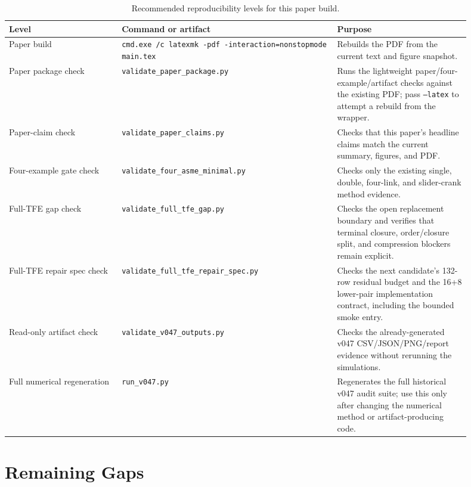 \documentclass[11pt]{article}
\newcommand{\tfe}{TFE}
\newcommand{\artifact}[1]{\texttt{#1}}
\begin{document}
\begin{table}[t]
\centering
\caption{Recommended reproducibility levels for this paper build.}
\label{tab:repro-levels}
\begin{tabular}{P{0.22\linewidth}P{0.42\linewidth}P{0.26\linewidth}}
\toprule
Level & Command or artifact & Purpose \\
\midrule
Paper build &
\artifact{cmd.exe /c latexmk -pdf -interaction=nonstopmode main.tex} &
Rebuilds the PDF from the current text and figure snapshot. \\
Paper package check &
\artifact{validate\_paper\_package.py} &
Runs the lightweight paper/four-example/artifact checks against the existing
PDF; pass \artifact{--latex} to attempt a rebuild from the wrapper. \\
Paper-claim check &
\artifact{validate\_paper\_claims.py} &
Checks that this paper's headline claims match the current summary, figures,
and PDF. \\
Four-example gate check &
\artifact{validate\_four\_asme\_minimal.py} &
Checks only the existing single, double, four-link, and slider-crank method
evidence. \\
Full-\tfe{} gap check &
\artifact{validate\_full\_tfe\_gap.py} &
Checks the open replacement boundary and verifies that terminal closure,
order/closure split, and compression blockers remain explicit. \\
Full-\tfe{} repair spec check &
\artifact{validate\_full\_tfe\_repair\_spec.py} &
Checks the next candidate's 132-row residual budget and the 16+8 lower-pair
implementation contract, including the bounded smoke entry. \\
Read-only artifact check &
\artifact{validate\_v047\_outputs.py} &
Checks the already-generated v047 CSV/JSON/PNG/report evidence without
rerunning the simulations. \\
Full numerical regeneration &
\artifact{run\_v047.py} &
Regenerates the full historical v047 audit suite; use this only after changing
the numerical method or artifact-producing code. \\
\bottomrule
\end{tabular}
\end{table}

\section{Remaining Gaps}
\end{document}
